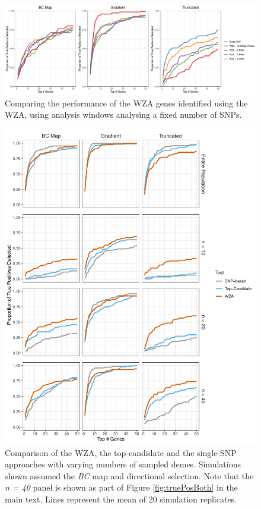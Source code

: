 \documentclass[10pt,twoside,lineno, twocolumn]{GSA_format}
\begin{document}
\pagebreak

\begin{figure}[H]
  \includegraphics[width = \textwidth,keepaspectratio]{Plots/SNP_number.pdf}
  \caption{Comparing the performance of the WZA genes identified using the WZA, using analysis windows analysing a fixed number of SNPs.}

  \label{fig:demoPlots}
\end{figure}

\pagebreak


\begin{figure}[H]
  \includegraphics[width = \textwidth,keepaspectratio]{Plots/SampleSizeComparison.pdf}
  \caption{Comparison of the WZA, the top-candidate and the single-SNP approaches with varying numbers of sampled demes. Simulations shown assumed the \textit{BC} map and directional selection. Note that the \textit{n = 40} panel is shown as part of Figure \ref{fig:truePosBoth} in the main text. Lines represent the mean of 20 simulation replicates.}

  \label{fig:sampleSize_demes}
\end{figure}
\end{document}
